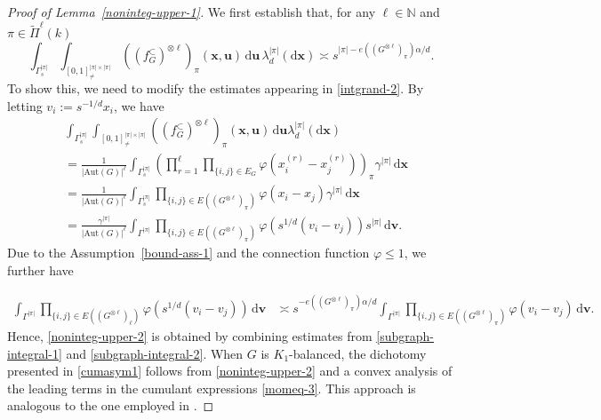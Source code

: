 \documentclass{article}
\theoremstyle{definition}
\numberwithin{equation}{section}
\theoremstyle{remark}
\begin{document}
\begin{proof}[Proof of Lemma~\ref{noninteg-upper-1}]
We first establish that,
for any $\ell\in\mathbb{N}$ and  $\pi\in\widetilde{\Pi}^\ell(k)$
\begin{equation}\label{noninteg-upper-2}
\int_{\Gamma_s^{|\pi|}}\int_{[0,1]^{|\pi|\times|\pi|}_{\ne}}((f^{\subset}_G)^{\otimes\ell})_{\pi}(\bm{x},\bm{u})\,\mathrm{d}\bm{u}\,\lambda_d^{|\pi|}(\mathrm{d}\bm{x})\asymp 
s^{|\pi|-e((G^{\otimes\ell})_\pi)\alpha/d}.
\end{equation}
To show this, we need to modify the estimates appearing in \eqref{intgrand-2}. By letting $v_i:=s^{-1/d}x_i$, we have 
\begin{align}
  	&\int_{\Gamma_s^{|\pi|}}\int_{[0,1]^{|\pi|\times|\pi|}_{\ne}}((f^{\subset}_G)^{\otimes\ell})_{\pi}(\bm{x},\bm{u})\,\mathrm{d}\bm{u}\lambda_d^{|\pi|}(\mathrm{d}\bm{x})\nonumber\\
	&=\frac1{|\mathrm{Aut}(G)|^\ell}\int_{\Gamma_s^{|\pi|}}\left(\prod_{r=1}^\ell\prod_{\{i,j\}\in E_G}\varphi\left(x_i^{(r)}-x_j^{(r)}\right)\right)_{\pi}\gamma^{|\pi|}\,\mathrm{d}\bm{x}\nonumber\\
	&=\frac1{|\mathrm{Aut}(G)|^\ell}\int_{\Gamma_s^{|\pi|}}\prod_{\{i,j\}\in E((G^{\otimes\ell})_\pi)}\varphi(x_i-x_j)\gamma^{|\pi|}\,\mathrm{d}\bm{x}\nonumber\\
	&=\frac{\gamma^{|\pi|}}{|\mathrm{Aut}(G)|^\ell}\int_{\Gamma^{|\pi|}}\prod_{\{i,j\}\in E((G^{\otimes\ell})_\pi)}\varphi(s^{1/d}(v_i-v_j))s^{|\pi|}\,\mathrm{d}\bm{v}.\label{subgraph-integral-1}
\end{align}
Due to the Assumption~\ref{bound-ass-1} and the connection function $\varphi\le1$, we further have

\begin{align}\label{subgraph-integral-2}
	\int_{\Gamma^{|\pi|}}\prod_{\{i,j\}\in E((G^{\otimes\ell})_\ell)}\varphi(s^{1/d}(v_i-v_j))\,\mathrm{d}\bm{v}&\asymp s^{-e((G^{\otimes\ell})_\pi)\alpha/d}\int_{\Gamma^{|\pi|}}\prod_{\{i,j\}\in E((G^{\otimes\ell})_\pi)}\varphi(v_i-v_j)\,\mathrm{d}\bm{v}.
\end{align}
Hence, \eqref{noninteg-upper-2} is obtained by combining estimates from \eqref{subgraph-integral-1} and \eqref{subgraph-integral-2}.
When $G$ is $K_1$-balanced, the dichotomy presented in \eqref{cumasym1} follows from  \eqref{noninteg-upper-2} and a convex analysis of the leading terms in the cumulant expressions \eqref{momeq-3}. This approach is analogous to the one employed in \cite[Proposition~7.1]{LiuPrivault25b}.
\end{proof}
\end{document}
